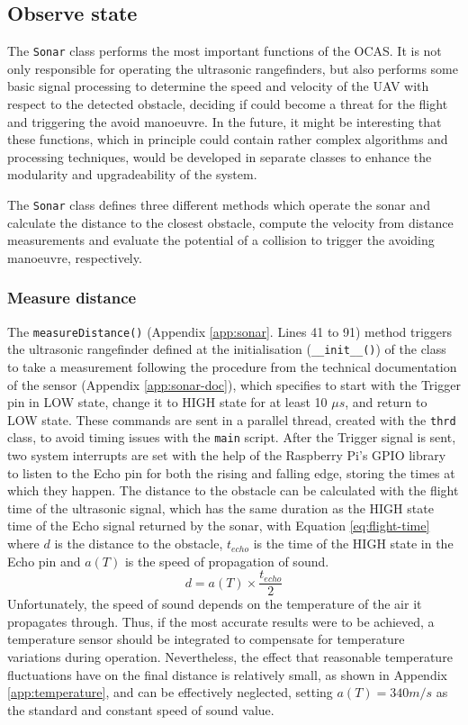 \subsection{Observe state}

The \texttt{Sonar} class performs the most important functions of the OCAS.
It is not only responsible for operating the ultrasonic rangefinders, but also performs some basic signal processing to determine the speed and velocity of the UAV with respect to the detected obstacle, deciding if could become a threat for the flight and triggering the avoid manoeuvre.
In the future, it might be interesting that these functions, which in principle could contain rather complex algorithms and processing techniques, would be developed in separate classes to enhance the modularity and upgradeability of the system.

The \texttt{Sonar} class defines three different methods which operate the sonar and calculate the distance to the closest obstacle, compute the velocity from distance measurements and evaluate the potential of a collision to trigger the avoiding manoeuvre, respectively.

\subsubsection{Measure distance}

The \texttt{measureDistance()} (Appendix \ref{app:sonar}. Lines 41 to 91) method triggers the ultrasonic rangefinder defined at the initialisation (\texttt{\_\_init\_\_()}) of the class to take a measurement following the procedure from the technical documentation of the sensor (Appendix \ref{app:sonar-doc}), which specifies to start with the Trigger pin in LOW state, change it to HIGH state for at least 10 $\mu s$, and return to LOW state.
These commands are sent in a parallel thread, created with the \texttt{thrd} class, to avoid timing issues with the \texttt{main} script.
After the Trigger signal is sent, two system interrupts are set with the help of the Raspberry Pi's GPIO library to listen to the Echo pin for both the rising and falling edge, storing the times at which they happen.
The distance to the obstacle can be calculated with the flight time of the ultrasonic signal, which has the same duration as the HIGH state time of the Echo signal returned by the sonar, with Equation \eqref{eq:flight-time} where $d$ is the distance to the obstacle, $t_{echo}$ is the time of the HIGH state in the Echo pin and $a(T)$ is the speed of propagation of sound.
\begin{equation}
	d=a(T)\times \frac{t_{echo}}{2}
	\label{eq:flight-time}
\end{equation}
Unfortunately, the speed of sound depends on the temperature of the air it propagates through.
Thus, if the most accurate results were to be achieved, a temperature sensor should be integrated to compensate for temperature variations during operation.
Nevertheless, the effect that reasonable temperature fluctuations have on the final distance is relatively small, as shown in Appendix \ref{app:temperature}, and can be effectively neglected, setting $a(T)=340 m/s$ as the standard and constant speed of sound value.

